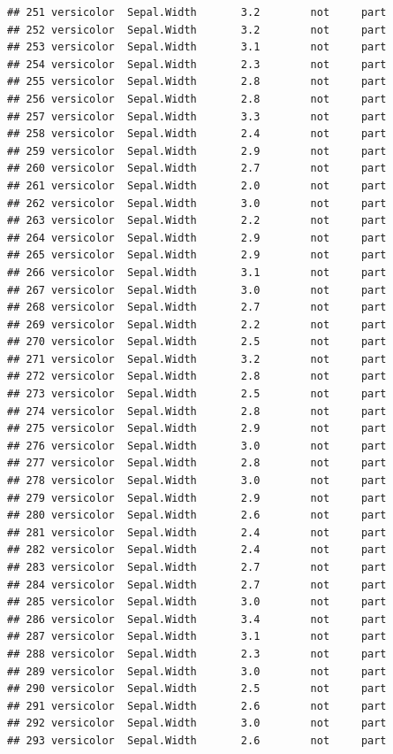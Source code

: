 \documentclass[krantz2]{krantz}\usepackage{knitr}%
\begin{document}
\begin{knitrout}
\begin{kframe}
\begin{verbatim}
## 251 versicolor  Sepal.Width       3.2        not     part
## 252 versicolor  Sepal.Width       3.2        not     part
## 253 versicolor  Sepal.Width       3.1        not     part
## 254 versicolor  Sepal.Width       2.3        not     part
## 255 versicolor  Sepal.Width       2.8        not     part
## 256 versicolor  Sepal.Width       2.8        not     part
## 257 versicolor  Sepal.Width       3.3        not     part
## 258 versicolor  Sepal.Width       2.4        not     part
## 259 versicolor  Sepal.Width       2.9        not     part
## 260 versicolor  Sepal.Width       2.7        not     part
## 261 versicolor  Sepal.Width       2.0        not     part
## 262 versicolor  Sepal.Width       3.0        not     part
## 263 versicolor  Sepal.Width       2.2        not     part
## 264 versicolor  Sepal.Width       2.9        not     part
## 265 versicolor  Sepal.Width       2.9        not     part
## 266 versicolor  Sepal.Width       3.1        not     part
## 267 versicolor  Sepal.Width       3.0        not     part
## 268 versicolor  Sepal.Width       2.7        not     part
## 269 versicolor  Sepal.Width       2.2        not     part
## 270 versicolor  Sepal.Width       2.5        not     part
## 271 versicolor  Sepal.Width       3.2        not     part
## 272 versicolor  Sepal.Width       2.8        not     part
## 273 versicolor  Sepal.Width       2.5        not     part
## 274 versicolor  Sepal.Width       2.8        not     part
## 275 versicolor  Sepal.Width       2.9        not     part
## 276 versicolor  Sepal.Width       3.0        not     part
## 277 versicolor  Sepal.Width       2.8        not     part
## 278 versicolor  Sepal.Width       3.0        not     part
## 279 versicolor  Sepal.Width       2.9        not     part
## 280 versicolor  Sepal.Width       2.6        not     part
## 281 versicolor  Sepal.Width       2.4        not     part
## 282 versicolor  Sepal.Width       2.4        not     part
## 283 versicolor  Sepal.Width       2.7        not     part
## 284 versicolor  Sepal.Width       2.7        not     part
## 285 versicolor  Sepal.Width       3.0        not     part
## 286 versicolor  Sepal.Width       3.4        not     part
## 287 versicolor  Sepal.Width       3.1        not     part
## 288 versicolor  Sepal.Width       2.3        not     part
## 289 versicolor  Sepal.Width       3.0        not     part
## 290 versicolor  Sepal.Width       2.5        not     part
## 291 versicolor  Sepal.Width       2.6        not     part
## 292 versicolor  Sepal.Width       3.0        not     part
## 293 versicolor  Sepal.Width       2.6        not     part

\end{verbatim}
\end{kframe}
\end{knitrout}
\end{document}
